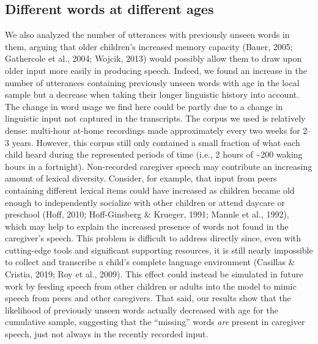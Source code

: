 \documentclass[
  english,
  man,floatsintext]{apa6}
\begin{document}
\hypertarget{different-words-at-different-ages}{%
\subsection{Different words at different ages}\label{different-words-at-different-ages}}

We also analyzed the number of utterances with previously unseen words in them, arguing that older children's increased memory capacity (Bauer, 2005; Gathercole et al., 2004; Wojcik, 2013) would possibly allow them to draw upon older input more easily in producing speech. Indeed, we found an increase in the number of utterances containing previously unseen words with age in the local sample but a decrease when taking their longer linguistic history into account. The change in word usage we find here could be partly due to a change in linguistic input not captured in the transcripts. The corpus we used is relatively dense: multi-hour at-home recordings made approximately every two weeks for 2--3 years. However, this corpus still only contained a small fraction of what each child heard during the represented periods of time (i.e., 2 hours of \textasciitilde200 waking hours in a fortnight). Non-recorded caregiver speech may contribute an increasing amount of lexical diversity. Consider, for example, that input from peers containing different lexical items could have increased as children became old enough to independently socialize with other children or attend daycare or preschool (Hoff, 2010; Hoff-Ginsberg \& Krueger, 1991; Mannle et al., 1992), which may help to explain the increased presence of words not found in the caregiver's speech. This problem is difficult to address directly since, even with cutting-edge tools and significant supporting resources, it is still nearly impossible to collect and transcribe a child's complete language environment (Casillas \& Cristia, 2019; Roy et al., 2009). This effect could instead be simulated in future work by feeding speech from other children or adults into the model to mimic speech from peers and other caregivers. That said, our results show that the likelihood of previously unseen words actually decreased with age for the cumulative sample, suggesting that the \enquote{missing} words \emph{are} present in caregiver speech, just not always in the recently recorded input.
\end{document}

